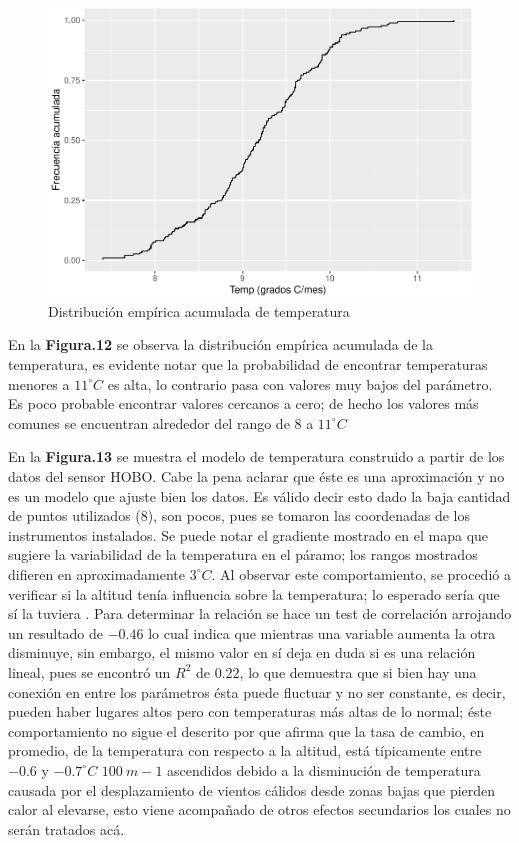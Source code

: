 \documentclass[conference,final,]{IEEEtran}
\makeatletter
\def\maxwidth{\ifdim\Gin@nat@width>\linewidth\linewidth
\else\Gin@nat@width\fi}
\let\Oldincludegraphics\includegraphics
\renewcommand{\includegraphics}[1]{\Oldincludegraphics[width=\maxwidth]{#1}}
\makeatother
\begin{document}
\begin{figure}
\centering
\includegraphics{Hidrology_files/figure-latex/unnamed-chunk-23-1.pdf}
\caption{Distribución empírica acumulada de temperatura}
\end{figure}

En la \textbf{Figura.12} se observa la distribución empírica acumulada de
la temperatura, es evidente notar que la probabilidad de encontrar
temperaturas menores a \(11^{\circ}C\) es alta, lo contrario pasa con
valores muy bajos del parámetro. Es poco probable encontrar valores
cercanos a cero; de hecho los valores más comunes se encuentran
alrededor del rango de \(8\) a \(11^{\circ}C\)

En la \textbf{Figura.13} se muestra el modelo de temperatura construido a
partir de los datos del sensor HOBO. Cabe la pena aclarar que éste es
una aproximación y no es un modelo que ajuste bien los datos. Es válido
decir esto dado la baja cantidad de puntos utilizados (\(8\)), son
pocos, pues se tomaron las coordenadas de los instrumentos instalados.
Se puede notar el gradiente mostrado en el mapa que sugiere la
variabilidad de la temperatura en el páramo; los rangos mostrados
difieren en aproximadamente \(3^{\circ}C\). Al observar este
comportamiento, se procedió a verificar si la altitud tenía influencia
sobre la temperatura; lo esperado sería que sí la tuviera
\citep{basantes}. Para determinar la relación se hace un test de
correlación arrojando un resultado de \(-0.46\) lo cual indica que
mientras una variable aumenta la otra disminuye, sin embargo, el mismo
valor en sí deja en duda si es una relación lineal, pues se encontró un
\(R^2\) de \(0.22\), lo que demuestra que si bien hay una conexión en
entre los parámetros ésta puede fluctuar y no ser constante, es decir,
pueden haber lugares altos pero con temperaturas más altas de lo normal;
éste comportamiento no sigue el descrito por \citep{van} que afirma que
la tasa de cambio, en promedio, de la temperatura con respecto a la
altitud, está típicamente entre \(-0.6\) y \(-0.7^{\circ}C\)
\(100 \ m-1\) ascendidos debido a la disminución de temperatura causada
por el desplazamiento de vientos cálidos desde zonas bajas que pierden
calor al elevarse, esto viene acompañado de otros efectos secundarios
\citep{buyta} los cuales no serán tratados acá.
\end{document}
